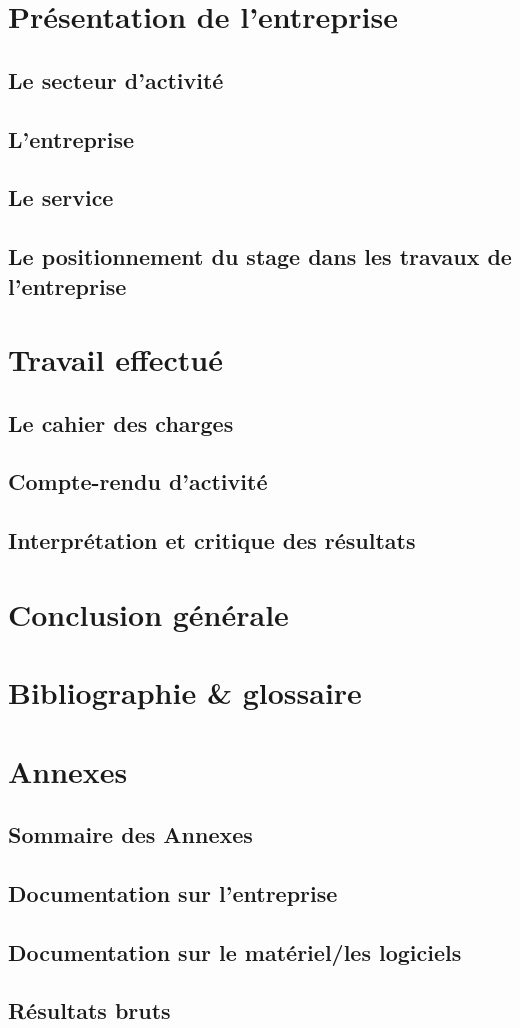 \documentclass[a4paper, 11pt]{report}
\begin{document}
\chapter{Présentation de l'entreprise}
  \section{Le secteur d'activité}
  \section{L'entreprise}
  \section{Le service}
  \section{Le positionnement du stage dans les travaux de l'entreprise}
\chapter{Travail effectué}
  \section{Le cahier des charges}
  \section{Compte-rendu d'activité}
  \section{Interprétation et critique des résultats}
\chapter{Conclusion générale}
\chapter{Bibliographie \& glossaire}
\chapter{Annexes}
  \section{Sommaire des Annexes}
  \section{Documentation sur l'entreprise}
  \section{Documentation sur le matériel/les logiciels}
  \section{Résultats bruts}
\end{document}
